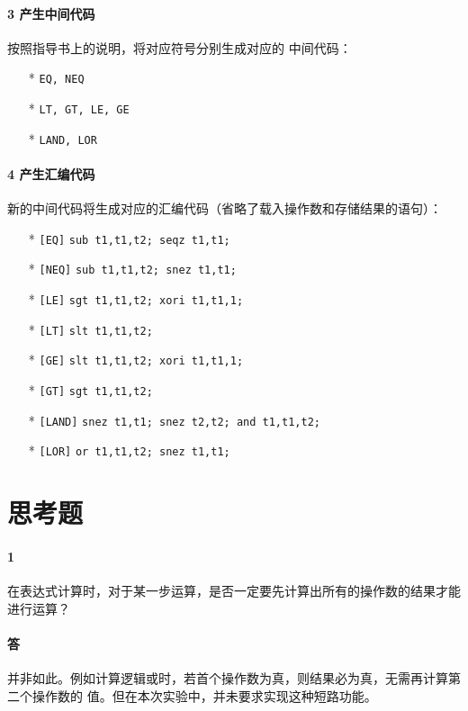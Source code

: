 \documentclass[UTF8]{ctexart}
\newcommand{\T}[1]{\texttt{{#1}}}
\begin{document}
            \paragraph{3 产生中间代码} 按照指导书上的说明，将对应符号分别生成对应的
            中间代码：
            \begin{itemize}
                \item[*] \T{EQ, NEQ}
                \item[*] \T{LT, GT, LE, GE}
                \item[*] \T{LAND, LOR}
            \end{itemize}

            \paragraph{4 产生汇编代码} 新的中间代码将生成对应的汇编代码（省略了载入操作数和存储结果的语句）：
            \begin{itemize}
                \item[*] \T{[EQ]} \T{sub t1,t1,t2; seqz t1,t1;}
                \item[*] \T{[NEQ]} \T{sub t1,t1,t2; snez t1,t1;}
                \item[*] \T{[LE]} \T{sgt t1,t1,t2; xori t1,t1,1;}
                \item[*] \T{[LT]} \T{slt t1,t1,t2;}
                \item[*] \T{[GE]} \T{slt t1,t1,t2; xori t1,t1,1;}
                \item[*] \T{[GT]} \T{sgt t1,t1,t2;}
                \item[*] \T{[LAND]} \T{snez t1,t1; snez t2,t2; and t1,t1,t2;}
                \item[*] \T{[LOR]} \T{or t1,t1,t2; snez t1,t1;}         
            \end{itemize}
        
    \section{思考题}
        \paragraph{1} 在表达式计算时，对于某一步运算，是否一定要先计算出所有的操作数的结果才能进行运算？
        \paragraph{答} 并非如此。例如计算逻辑或时，若首个操作数为真，则结果必为真，无需再计算第二个操作数的
        值。但在本次实验中，并未要求实现这种短路功能。
\end{document}
